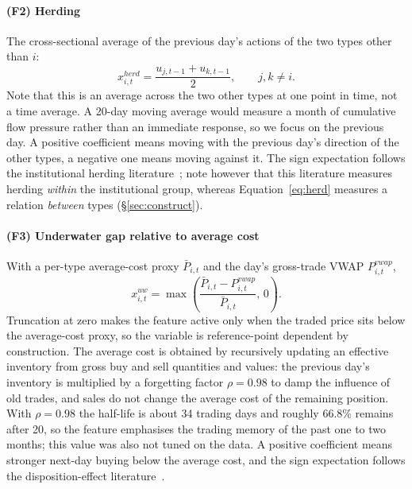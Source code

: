 \paragraph{(F2) Herding}
The cross-sectional average of the previous day's actions of the two types other
than $i$:
\begin{equation}
x^{herd}_{i,t}=\frac{u_{j,t-1}+u_{k,t-1}}{2},\qquad j,k\neq i.
\label{eq:herd}
\end{equation}
Note that this is an average across the two other types at one point in time,
not a time average. A 20-day moving average would measure a month of cumulative
flow pressure rather than an immediate response, so we focus on the previous
day. A positive coefficient means moving with the previous day's direction of
the other types, a negative one means moving against it. The sign expectation
follows the institutional herding
literature~\cite{lakonishok1992impact}; note however that this literature
measures herding \emph{within} the institutional group, whereas
Equation~\eqref{eq:herd} measures a relation \emph{between} types
(\S\ref{sec:construct}).

\paragraph{(F3) Underwater gap relative to average cost}
With a per-type average-cost proxy $\bar P_{i,t}$ and the day's gross-trade VWAP
$P^{vwap}_{i,t}$,
\begin{equation}
x^{uw}_{i,t}=\max\!\left(
\frac{\bar P_{i,t}-P^{vwap}_{i,t}}{\bar P_{i,t}},\,0\right).
\label{eq:underwater}
\end{equation}
Truncation at zero makes the feature active only when the traded price sits
below the average-cost proxy, so the variable is reference-point dependent by
construction. The average cost is obtained by recursively updating an effective
inventory from gross buy and sell quantities and values: the previous day's
inventory is multiplied by a forgetting factor $\rho=0.98$ to damp the influence
of old trades, and sales do not change the average cost of the remaining
position. With $\rho=0.98$ the half-life is about 34 trading days and roughly
66.8\% remains after 20, so the feature emphasises the trading memory of the
past one to two months; this value was also not tuned on the data. A positive
coefficient means stronger next-day buying below the average cost, and the sign
expectation follows the disposition-effect
literature~\cite{shefrin1985disposition,odean1998investors}.

